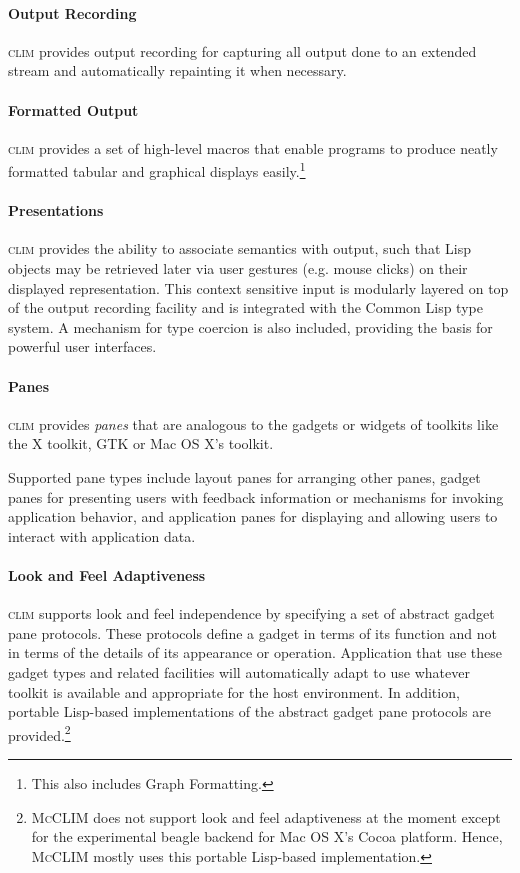 \documentclass[twocolumn,a4paper]{article}
\newcommand {\concept} [1] {{\sl #1}\index{#1}}
\newcommand {\CLIM}{\textsc{clim}}
\newcommand {\mcclim}{\textsc{McCLIM}}
\begin{document}
\paragraph*{Output Recording} \CLIM{} provides output recording for
capturing all output done to an extended stream and automatically
repainting it when necessary.

\paragraph*{Formatted Output} \CLIM{} provides a set of high-level
macros that enable programs to produce neatly formatted tabular and
graphical displays easily.\footnote{This also includes Graph
  Formatting.}

\paragraph*{Presentations} \CLIM{} provides the ability to associate
semantics with output, such that Lisp objects may be retrieved later
via user gestures (e.g.{} mouse clicks) on their displayed
representation. This context sensitive input is modularly layered on
top of the output recording facility and is integrated with the Common
Lisp type system. A mechanism for type coercion is also included,
providing the basis for powerful user interfaces.

\paragraph*{Panes} \CLIM{} provides \concept{panes} that are analogous
to the gadgets or widgets of toolkits like the X toolkit, GTK or Mac
OS X's toolkit.

Supported pane types include layout panes for arranging other panes,
gadget panes for presenting users with feedback information or
mechanisms for invoking application behavior, and application panes
for displaying and allowing users to interact with application data.

\paragraph*{Look and Feel Adaptiveness} \CLIM{} supports look and feel
independence by specifying a set of abstract gadget pane
protocols. These protocols define a gadget in terms of its function
and not in terms of the details of its appearance or
operation. Application that use these gadget types and related
facilities will automatically adapt to use whatever toolkit is
available and appropriate for the host environment. In addition,
portable Lisp-based implementations of the abstract gadget pane
protocols are provided.\footnote{\mcclim{} does not support look and feel
  adaptiveness at the moment except for the experimental beagle backend for Mac
  OS X's Cocoa platform. Hence, \mcclim{} mostly uses this portable Lisp-based
  implementation.}
\end{document}

